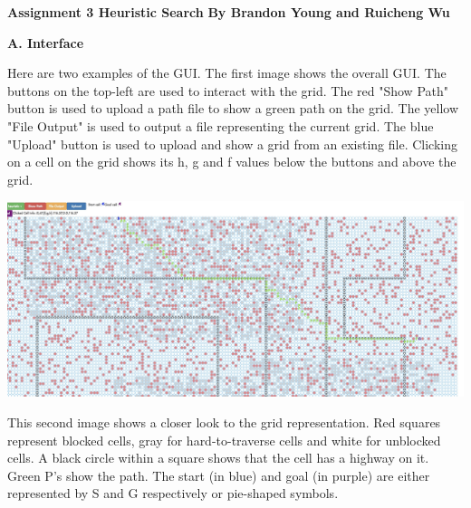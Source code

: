 \documentclass[12pt, letterpaper]{article}
\begin{document}
\noindent \textbf{\large Assignment 3 Heuristic Search }\newline
\noindent \textbf{By Brandon Young and Ruicheng Wu}

\bigskip

\noindent \textbf{A. Interface}

Here are two examples of the GUI. The first image shows the overall GUI. The buttons on the top-left are used to interact with the grid. The red "Show Path" button is used to upload a path file to show a green path on the grid. The yellow "File Output" is used to output a file representing the current grid. The blue "Upload" button is used to upload and show a grid from an existing file. Clicking on a cell on the grid shows its h, g and f values below the buttons and above the grid.

\medskip

\noindent \includegraphics[scale=0.35]{"a-map1-0"}

\medskip 

This second image shows a closer look to the grid representation. Red squares represent blocked cells, gray for hard-to-traverse cells and white for unblocked cells. A black circle within a square shows that the cell has a highway on it. Green P's show the path. The start (in blue) and goal (in purple) are either represented by S and G respectively or pie-shaped symbols.

\medskip
\end{document}
